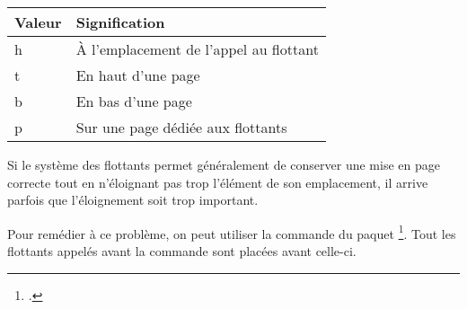 \begin{longtable}{|l|l|}
	\hline
	Valeur & Signification	\\
	\hline
	\endhead
	\hline
	\endfoot
	h 	& À l'emplacement de l'appel au flottant 	\\
	t 	& En haut d'une page				\\
	b 	& En bas d'une page				\\
	p 	& Sur une page dédiée aux flottants		\\
\end{longtable}


Si le système des flottants permet généralement de conserver une mise en page correcte tout en n'éloignant pas trop l'élément de son emplacement, il arrive parfois que l'éloignement soit trop important.

Pour remédier à ce problème, on peut utiliser la commande  du paquet \footcite{placeins}. 
Tout les flottants appelés avant la commande sont placées avant celle-ci.






	
